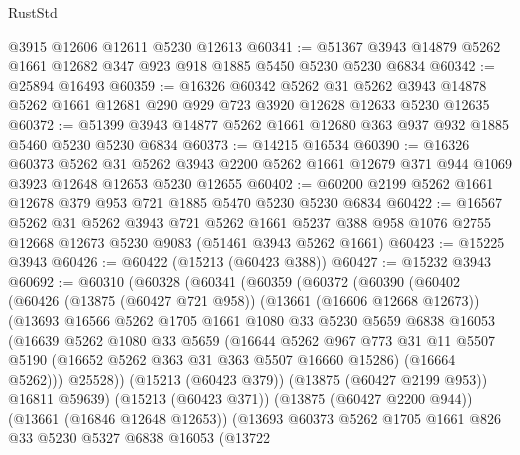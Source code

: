 \begin{lexlean}{RustStd}
\begin{coremodule}
    @3915
    @12606
    @12611
    @5230
    @12613
@60341 := @51367 @3943 @14879 @5262 @1661 @12682 @347 @923 @918 @1885 @5450 @5230 @5230 @6834
@60342 := @25894 @16493
@60359 := @16326
    @60342
    @5262
    @31
    @5262
    @3943
    @14878
    @5262
    @1661
    @12681
    @290
    @929
    @723
    @3920
    @12628
    @12633
    @5230
    @12635
@60372 := @51399 @3943 @14877 @5262 @1661 @12680 @363 @937 @932 @1885 @5460 @5230 @5230 @6834
@60373 := @14215 @16534
@60390 := @16326
    @60373
    @5262
    @31
    @5262
    @3943
    @2200
    @5262
    @1661
    @12679
    @371
    @944
    @1069
    @3923
    @12648
    @12653
    @5230
    @12655
@60402 := @60200 @2199 @5262 @1661 @12678 @379 @953 @721 @1885 @5470 @5230 @5230 @6834
@60422 := @16567
    @5262
    @31
    @5262
    @3943
    @721
    @5262
    @1661
    @5237
    @388
    @958
    @1076
    @2755
    @12668
    @12673
    @5230
    @9083
    (@51461 @3943 @5262 @1661)
@60423 := @15225 @3943
@60426 := @60422 (@15213 (@60423 @388))
@60427 := @15232 @3943
@60692 := @60310
    (@60328
      (@60341
        (@60359
          (@60372
            (@60390
              (@60402
                (@60426
                  (@13875 (@60427 @721 @958))
                  (@13661 (@16606 @12668 @12673))
                  (@13693
                    @16566
                    @5262
                    @1705
                    @1661
                    @1080
                    @33
                    @5230
                    @5659
                    @6838
                    @16053
                    (@16639
                      @5262
                      @1080
                      @33
                      @5659
                      (@16644
                        @5262
                        @967
                        @773
                        @31
                        @11
                        @5507
                        @5190
                        (@16652 @5262 @363 @31 @363 @5507 @16660 @15286)
                        (@16664 @5262)))
                    @25528))
                (@15213 (@60423 @379))
                (@13875 (@60427 @2199 @953))
                @16811
                @59639)
              (@15213 (@60423 @371))
              (@13875 (@60427 @2200 @944))
              (@13661 (@16846 @12648 @12653))
              (@13693
                @60373
                @5262
                @1705
                @1661
                @826
                @33
                @5230
                @5327
                @6838
                @16053
                (@13722

\end{coremodule}
\end{lexlean}
